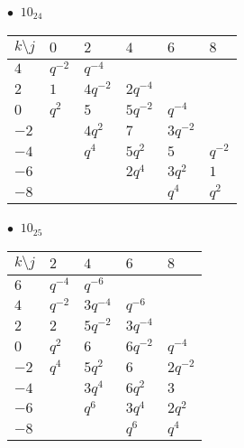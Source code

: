 \begin{minipage}{\linewidth}
$\bullet\ $ $10_{24}$ \vspace{0.5em} \\
\begin{tabular}{l|lllll}
$k \setminus j$ & $0$ & $2$ & $4$ & $6$ & $8$ \\
\hline
$4$ & $q^{-2}$ & $q^{-4}$ &  &  &  \\
$2$ & $1$ & $4q^{-2}$ & $2q^{-4}$ &  &  \\
$0$ & $q^{2}$ & $5$ & $5q^{-2}$ & $q^{-4}$ &  \\
$-2$ &  & $4q^{2}$ & $7$ & $3q^{-2}$ &  \\
$-4$ &  & $q^{4}$ & $5q^{2}$ & $5$ & $q^{-2}$ \\
$-6$ &  &  & $2q^{4}$ & $3q^{2}$ & $1$ \\
$-8$ &  &  &  & $q^{4}$ & $q^{2}$ \\
\end{tabular}
\vspace{2em}
\end{minipage}
%
\begin{minipage}{\linewidth}
$\bullet\ $ $10_{25}$ \vspace{0.5em} \\
\begin{tabular}{l|llll}
$k \setminus j$ & $2$ & $4$ & $6$ & $8$ \\
\hline
$6$ & $q^{-4}$ & $q^{-6}$ &  &  \\
$4$ & $q^{-2}$ & $3q^{-4}$ & $q^{-6}$ &  \\
$2$ & $2$ & $5q^{-2}$ & $3q^{-4}$ &  \\
$0$ & $q^{2}$ & $6$ & $6q^{-2}$ & $q^{-4}$ \\
$-2$ & $q^{4}$ & $5q^{2}$ & $6$ & $2q^{-2}$ \\
$-4$ &  & $3q^{4}$ & $6q^{2}$ & $3$ \\
$-6$ &  & $q^{6}$ & $3q^{4}$ & $2q^{2}$ \\
$-8$ &  &  & $q^{6}$ & $q^{4}$ \\
\end{tabular}
\vspace{2em}
\end{minipage}
%
